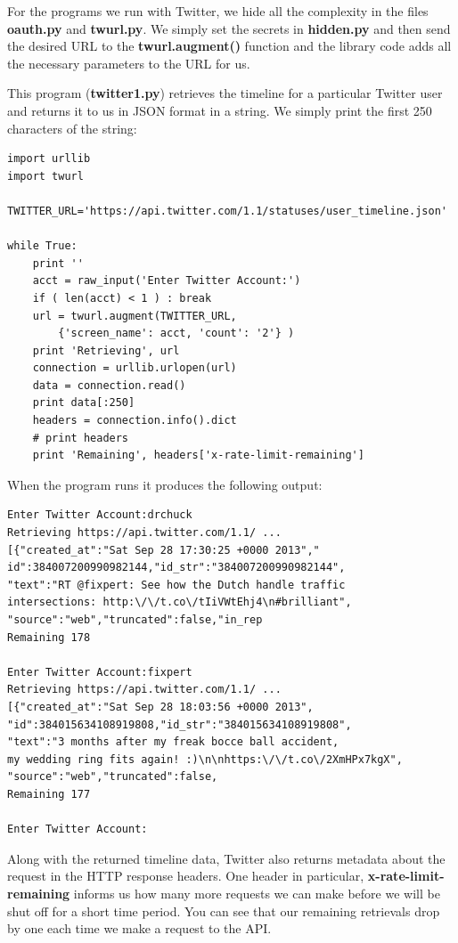 \documentclass[11pt]{book}
\begin{document}
For the programs we run with Twitter, we hide all the 
complexity in the files {\bf oauth.py} and {\bf twurl.py}.
We simply set the secrets in {\bf hidden.py} and then 
send the desired URL to the {\bf twurl.augment()} 
function and the library code adds all the necessary 
parameters to the URL for us.

This program ({\bf twitter1.py}) retrieves the timeline
for a particular Twitter user and returns it to us in JSON
format in a string.  We simply print the first 250 characters
of the string:

\beforeverb
\begin{verbatim}
import urllib
import twurl

TWITTER_URL='https://api.twitter.com/1.1/statuses/user_timeline.json'

while True:
    print ''
    acct = raw_input('Enter Twitter Account:')
    if ( len(acct) < 1 ) : break
    url = twurl.augment(TWITTER_URL,
        {'screen_name': acct, 'count': '2'} )
    print 'Retrieving', url
    connection = urllib.urlopen(url)
    data = connection.read()
    print data[:250]
    headers = connection.info().dict
    # print headers
    print 'Remaining', headers['x-rate-limit-remaining']
\end{verbatim}
\afterverb
%
When the program runs it produces the following output: 
 
\beforeverb
\begin{verbatim}
Enter Twitter Account:drchuck
Retrieving https://api.twitter.com/1.1/ ...
[{"created_at":"Sat Sep 28 17:30:25 +0000 2013","
id":384007200990982144,"id_str":"384007200990982144",
"text":"RT @fixpert: See how the Dutch handle traffic 
intersections: http:\/\/t.co\/tIiVWtEhj4\n#brilliant",
"source":"web","truncated":false,"in_rep
Remaining 178

Enter Twitter Account:fixpert
Retrieving https://api.twitter.com/1.1/ ...
[{"created_at":"Sat Sep 28 18:03:56 +0000 2013",
"id":384015634108919808,"id_str":"384015634108919808",
"text":"3 months after my freak bocce ball accident, 
my wedding ring fits again! :)\n\nhttps:\/\/t.co\/2XmHPx7kgX",
"source":"web","truncated":false,
Remaining 177

Enter Twitter Account:
\end{verbatim}
\afterverb
%
Along with the returned timeline data, Twitter also returns
metadata about the request in the HTTP response headers. 
One header in particular, {\bf x-rate-limit-remaining} informs
us how many more requests we can make before we will be shut 
off for a short time period.  You can see that our remaining 
retrievals drop by one each time we make a request to the 
API.
\end{document}
